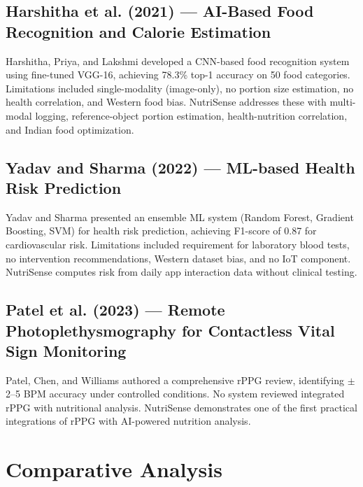 \documentclass[12pt,a4paper]{report}
\begin{document}
\subsection{Harshitha et al. (2021) --- AI-Based Food Recognition and Calorie Estimation}
Harshitha, Priya, and Lakshmi \cite{harshitha2021} developed a CNN-based food recognition system using fine-tuned VGG-16, achieving 78.3\% top-1 accuracy on 50 food categories. Limitations included single-modality (image-only), no portion size estimation, no health correlation, and Western food bias. NutriSense addresses these with multi-modal logging, reference-object portion estimation, health-nutrition correlation, and Indian food optimization.

\subsection{Yadav and Sharma (2022) --- ML-based Health Risk Prediction}
Yadav and Sharma \cite{yadav2022} presented an ensemble ML system (Random Forest, Gradient Boosting, SVM) for health risk prediction, achieving F1-score of 0.87 for cardiovascular risk. Limitations included requirement for laboratory blood tests, no intervention recommendations, Western dataset bias, and no IoT component. NutriSense computes risk from daily app interaction data without clinical testing.

\subsection{Patel et al. (2023) --- Remote Photoplethysmography for Contactless Vital Sign Monitoring}
Patel, Chen, and Williams \cite{patel2023} authored a comprehensive rPPG review, identifying $\pm$2--5 BPM accuracy under controlled conditions. No system reviewed integrated rPPG with nutritional analysis. NutriSense demonstrates one of the first practical integrations of rPPG with AI-powered nutrition analysis.

\section{Comparative Analysis}
\end{document}
